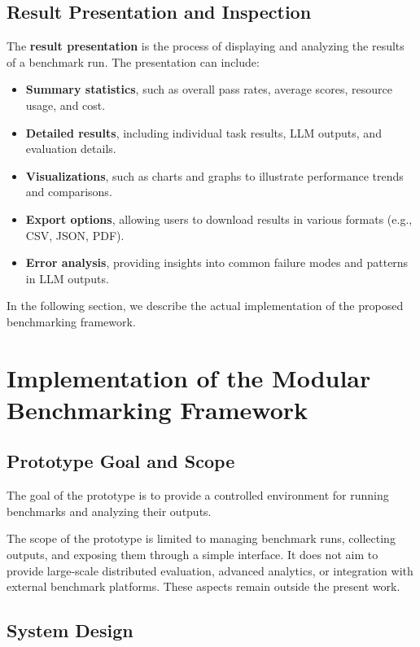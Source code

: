 \subsection{Result Presentation and Inspection}
The \textbf{result presentation} is the process of displaying and analyzing the results of a benchmark run.
The presentation can include:
\begin{itemize}
    \item \textbf{Summary statistics}, such as overall pass rates, average scores, resource usage, and cost.
    \item \textbf{Detailed results}, including individual task results, LLM outputs, and evaluation details.
    \item \textbf{Visualizations}, such as charts and graphs to illustrate performance trends and comparisons.
    \item \textbf{Export options}, allowing users to download results in various formats (e.g., CSV, JSON, PDF).
    \item \textbf{Error analysis}, providing insights into common failure modes and patterns in LLM outputs.
\end{itemize}

In the following section, we describe the actual implementation of the proposed benchmarking framework.

\section{Implementation of the Modular Benchmarking Framework}

\subsection{Prototype Goal and Scope}

The goal of the prototype is to provide a controlled environment for running benchmarks and analyzing their outputs.

The scope of the prototype is limited to managing benchmark runs, collecting outputs, and exposing them through a simple interface.
It does not aim to provide large-scale distributed evaluation, advanced analytics, or integration with external benchmark platforms.
These aspects remain outside the present work.

\subsection{System Design}

